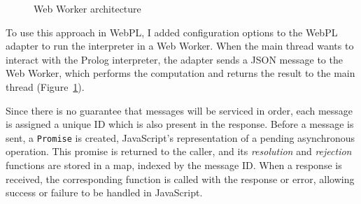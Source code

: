 \begin{figure}[H]
\centering
{}
\caption{Web Worker architecture}
\label{fig:web-worker-arch}
\end{figure}

\vspace*{-1.5em}

To use this approach in WebPL, I added configuration options to the WebPL adapter to run the interpreter in a Web Worker. When the main thread wants to interact with the Prolog interpreter, the adapter sends a JSON message to the Web Worker, which performs the computation and returns the result to the main thread (Figure~\ref{fig:web-worker-arch}).

Since there is no guarantee that messages will be serviced in order, each message is assigned a unique ID which is also present in the response. Before a message is sent, a \texttt{Promise} is created, JavaScript's representation of a pending asynchronous operation. This promise is returned to the caller, and its \emph{resolution} and \emph{rejection} functions are stored in a map, indexed by the message ID. When a response is received, the corresponding function is called with the response or error, allowing success or failure to be handled in JavaScript.